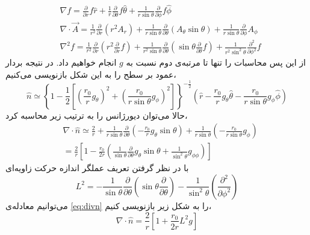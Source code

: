 \begin{equation}
\begin{aligned}
&\nabla f =\frac{\partial}{\partial r}f\hat r + \frac{1}{r} \frac{\partial}{\partial\theta}f\hat\theta+ \frac{1}{r\sin\theta} \frac{\partial}{\partial\phi}f\hat\phi\\
&\nabla\cdot \vec A =\frac{1}{r^2}\frac{\partial}{\partial r}(r^2A_r)+ \frac{1}{r\sin\theta} \frac{\partial}{\partial\theta}(A_\theta\sin\theta)+ \frac{1}{r\sin\theta} \frac{\partial}{\partial\phi}A_\phi\\
&\nabla^2f =\frac{1}{r^2}\frac{\partial}{\partial r}\left(r^2\frac{\partial}{\partial r}f\right)+ \frac{1}{r^2\sin\theta} \frac{\partial}{\partial\theta}\left(\sin\theta\frac{\partial}{\partial\theta}f\right)+ \frac{1}{r^2\sin^2\theta} \frac{\partial^2}{\partial\phi^2}f
\end{aligned}
\end{equation}
از این پس محاسبات را تنها تا مرتبه‌ی دوم نسبت به $g$ 
انجام خواهیم داد. در نتیجه بردار عمود بر سطح را به این شکل بازنویسی می‌کنیم،
\begin{equation}
\hat n \simeq\left\{1-\frac{1}{2}\left[\left(\frac{r_0}{r}g_\theta\right)^2+\left(\frac{r_0}{r\sin\theta}g_\phi\right)^2 \right]\right\}^{-\frac{1}{2}}\left( \hat r-\frac{r_0}{r}g_\theta \hat\theta-\frac{r_0}{r\sin\theta}g_\phi\hat\phi \right)
\end{equation}
حالا می‌توان دیورژانس را به ترتیب زیر محاسبه کرد،
\begin{equation}
\begin{aligned}
&\nabla\cdot\hat n \simeq \frac{2}{r}+\frac{1}{r\sin\theta}\frac{\partial}{\partial\theta}\left(-\frac{r_0}{r}g_\theta\sin\theta\right)+\frac{1}{r\sin\theta}\left(-\frac{r_0}{r\sin\theta}g_\phi\right)\\
&=\frac{2}{r}\left[1-\frac{r_0}{2r}\left(\frac{1}{\sin\theta}\frac{\partial}{\partial\theta}g_\theta\sin\theta+\frac{1}{\sin^2\theta}g_{\phi\phi}\right)\right]
\label{eq:divn}
\end{aligned}
\end{equation}
با در نظر گرفتن تعریف عملگر اندازه حرکت زاویه‌ای 
\begin{equation}
L^2=-\frac{1}{\sin\theta}\frac{\partial}{\partial\theta}\left(\sin\theta\frac{\partial}{\partial\theta}\right)-\frac{1}{\sin^2\theta}\left(\frac{\partial^2}{\partial\phi^2}\right)
\end{equation}
می‌توانیم معادله‌ی
\ref{eq:divn}
را به شکل زیر بازنویسی کنیم،
\begin{equation}
\nabla\cdot\hat n =\frac{2}{r}\left[1+\frac{r_0}{2r}L^2g\right]
\label{eq:divnL2}
\end{equation}
